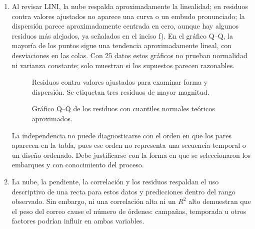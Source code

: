 \begin{enumerate}
    \item[\textbf{m)}] Al revisar LINI, la nube respalda aproximadamente la linealidad; en residuos contra valores ajustados no aparece una curva o un embudo pronunciado; la dispersión parece aproximadamente centrada en cero, aunque hay algunos residuos más alejados, ya señalados en el inciso f). En el gráfico Q--Q, la mayoría de los puntos sigue una tendencia aproximadamente lineal, con desviaciones en las colas. Con 25 datos estos gráficos no prueban normalidad ni varianza constante; solo muestran si los supuestos parecen razonables.
    \begin{figure}[H]
    \centering
    
    \caption{Residuos contra valores ajustados para examinar forma y dispersión. Se etiquetan tres residuos de mayor magnitud.}
    \label{fig:clase4-mail-integrador-residuos}
    \end{figure}
    \begin{figure}[H]
    \centering
    
    \caption{Gráfico Q--Q de los residuos con cuantiles normales teóricos aproximados.}
    \label{fig:clase4-mail-integrador-qq}
    \end{figure}
    La independencia no puede diagnosticarse con el orden en que los pares aparecen en la tabla, pues ese orden no representa una secuencia temporal o un diseño ordenado. Debe justificarse con la forma en que se seleccionaron los embarques y con conocimiento del proceso.

    \item[\textbf{n)}] La nube, la pendiente, la correlación y los residuos respaldan el uso descriptivo de una recta para estos datos y predicciones dentro del rango observado. Sin embargo, ni una correlación alta ni un $R^2$ alto demuestran que el peso del correo cause el número de órdenes: campañas, temporada u otros factores podrían influir en ambas variables.
\end{enumerate}